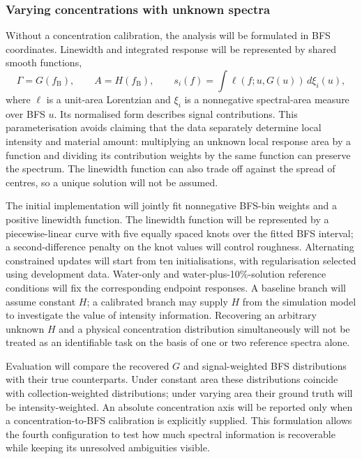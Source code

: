 \documentclass[11pt]{article}
\begin{document}
\subsubsection{Varying concentrations with unknown spectra}

Without a concentration calibration, the analysis will be formulated in BFS coordinates. Linewidth and integrated response will be represented by shared smooth functions,
\begin{equation}
 \Gamma=G(f_{\mathrm B}),\qquad A=H(f_{\mathrm B}),\qquad
 s_i(f)=\int \ell(f;u,G(u))\,d\xi_i(u),
 \label{eq:unknown_family}
\end{equation}
where $\ell$ is a unit-area Lorentzian and $\xi_i$ is a nonnegative spectral-area measure over BFS $u$. Its normalised form describes signal contributions. This parameterisation avoids claiming that the data separately determine local intensity and material amount: multiplying an unknown local response area by a function and dividing its contribution weights by the same function can preserve the spectrum. The linewidth function can also trade off against the spread of centres, so a unique solution will not be assumed.

The initial implementation will jointly fit nonnegative BFS-bin weights and a positive linewidth function. The linewidth function will be represented by a piecewise-linear curve with five equally spaced knots over the fitted BFS interval; a second-difference penalty on the knot values will control roughness. Alternating constrained updates will start from ten initialisations, with regularisation selected using development data. Water-only and water-plus-10\%-solution reference conditions will fix the corresponding endpoint responses. A baseline branch will assume constant $H$; a calibrated branch may supply $H$ from the simulation model to investigate the value of intensity information. Recovering an arbitrary unknown $H$ and a physical concentration distribution simultaneously will not be treated as an identifiable task on the basis of one or two reference spectra alone.

Evaluation will compare the recovered $G$ and signal-weighted BFS distributions with their true counterparts. Under constant area these distributions coincide with collection-weighted distributions; under varying area their ground truth will be intensity-weighted. An absolute concentration axis will be reported only when a concentration-to-BFS calibration is explicitly supplied. This formulation allows the fourth configuration to test how much spectral information is recoverable while keeping its unresolved ambiguities visible.
\end{document}
